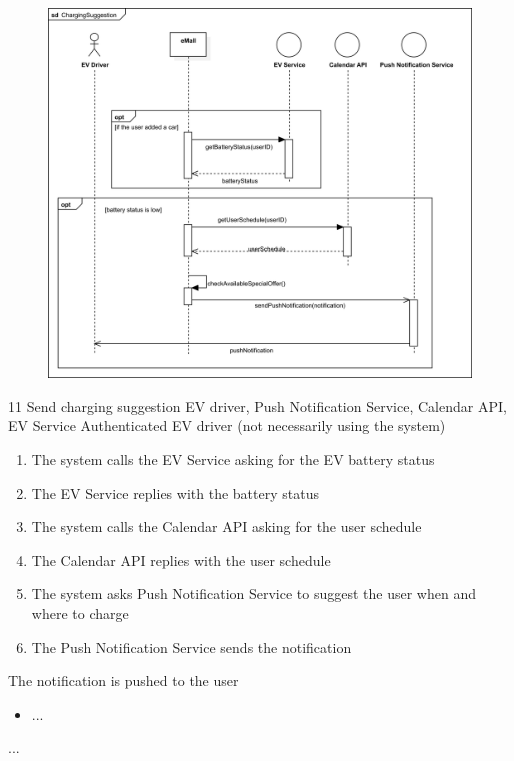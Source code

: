 \usecase
{
    \begin{figure}[H]
        \centering
        \includegraphics[scale=0.9]{src/sequence_diagram/chargeSuggestion.png}
    \end{figure}
}
{11}
{Send charging suggestion}
{EV driver, Push Notification Service, Calendar API, EV Service}
{Authenticated EV driver (not necessarily using the system)}
{
    \begin{enumerate}
        \item The system calls the EV Service asking for the EV battery status
        \item The EV Service replies with the battery status
        \item The system calls the Calendar API asking for the user schedule
        \item The Calendar API replies with the user schedule
        \item The system asks Push Notification Service to suggest the user when and where to charge
        \item The Push Notification Service sends the notification
    \end{enumerate}
}
{The notification is pushed to the user}
{
    \begin{itemize}
        \item ...
    \end{itemize}
}
{
    ...
}

